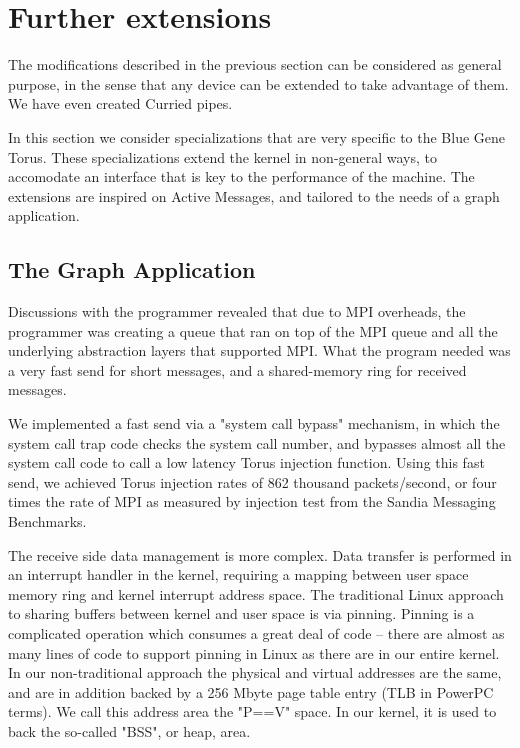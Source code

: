 \documentclass[letterpaper,twocolumn,10pt]{article}
\begin{document}
\section{Further extensions}
The modifications described in the previous section can be considered as general purpose, in the sense 
that any device can be extended to take advantage of them. We have even created Curried pipes. 

In this section we consider specializations that are very specific to the Blue Gene Torus. These specializations extend the kernel in non-general ways, to accomodate an interface that is key to the performance of the machine. The extensions are inspired on Active Messages,  and tailored to the needs of a graph application. 

\subsection{The Graph Application}

Discussions with the programmer revealed that due to MPI overheads, the programmer was creating a 
queue that ran on top of the MPI queue and all the underlying abstraction layers that supported MPI. 
What the program needed was a very fast send for short messages, and a shared-memory ring for received
messages. 

We implemented a fast send via a "system call bypass" mechanism, in which the system call trap code
checks the system call number, and bypasses almost all the system call code to call a low latency 
Torus injection function. Using this fast send, we achieved Torus injection rates of 862 thousand packets/second, or four times the rate of MPI as measured by injection test from the Sandia Messaging Benchmarks\cite{barrett2009application}. 

The receive side data management is more complex. Data transfer is performed in an interrupt 
handler in the kernel, requiring a mapping between user space memory ring and kernel interrupt address space. 
The traditional Linux approach to sharing buffers between kernel and user space is via pinning. Pinning is a complicated 
operation which consumes a great deal of code -- there are almost as many lines of code to support 
pinning in Linux as there are in our entire kernel. In our  non-traditional approach the physical and virtual addresses are the same, and are in addition backed by a 256 Mbyte page table entry (TLB in PowerPC terms). We call this address area the "P==V" space. In our kernel, it is used to back the so-called "BSS", or heap, area. 
\end{document}

